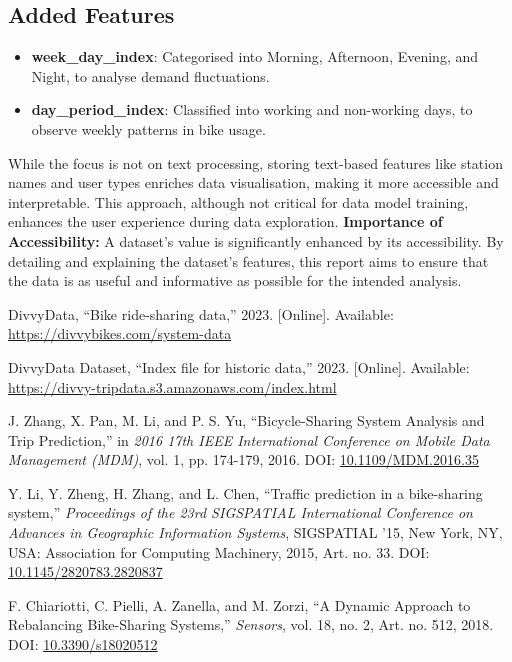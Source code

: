 \documentclass[12pt, a4paper]{article}
\begin{document}
    \subsection{Added Features}\label{subsec:added-features}
    \begin{itemize}
        \item \textbf{week\_day\_index}: Categorised into Morning, Afternoon, Evening, and Night, to analyse demand fluctuations.
        \item \textbf{day\_period\_index}: Classified into working and non-working days, to observe weekly patterns in bike usage.
    \end{itemize}

    While the focus is not on text processing, storing text-based features like station names and user types enriches data visualisation, making it more accessible and interpretable. This approach, although not critical for data model training, enhances the user experience during data exploration.
    \textbf{Importance of Accessibility:} \newline
    A dataset's value is significantly enhanced by its accessibility.
    By detailing and explaining the dataset's features, this report aims to ensure that the data is as useful and informative as possible for the intended analysis.

    \begin{thebibliography}{99} %

        DivvyData, ``Bike ride-sharing data,'' 2023. [Online]. Available: \url{https://divvybikes.com/system-data}

        DivvyData Dataset, ``Index file for historic data,'' 2023. [Online]. Available: \url{https://divvy-tripdata.s3.amazonaws.com/index.html}

        J. Zhang, X. Pan, M. Li, and P. S. Yu, ``Bicycle-Sharing System Analysis and Trip Prediction,'' in \textit{2016 17th IEEE International Conference on Mobile Data Management (MDM)}, vol. 1, pp. 174-179, 2016. DOI: \href{https://doi.org/10.1109/MDM.2016.35}{10.1109/MDM.2016.35}

        Y. Li, Y. Zheng, H. Zhang, and L. Chen, ``Traffic prediction in a bike-sharing system,'' \textit{Proceedings of the 23rd SIGSPATIAL International Conference on Advances in Geographic Information Systems}, SIGSPATIAL '15, New York, NY, USA: Association for Computing Machinery, 2015, Art. no. 33. DOI: \href{https://doi.org/10.1145/2820783.2820837}{10.1145/2820783.2820837}

        F. Chiariotti, C. Pielli, A. Zanella, and M. Zorzi, ``A Dynamic Approach to Rebalancing Bike-Sharing Systems,'' \textit{Sensors}, vol. 18, no. 2, Art. no. 512, 2018. DOI: \href{https://www.mdpi.com/1424-8220/18/2/512}{10.3390/s18020512}

    \end{thebibliography}
\end{document}
